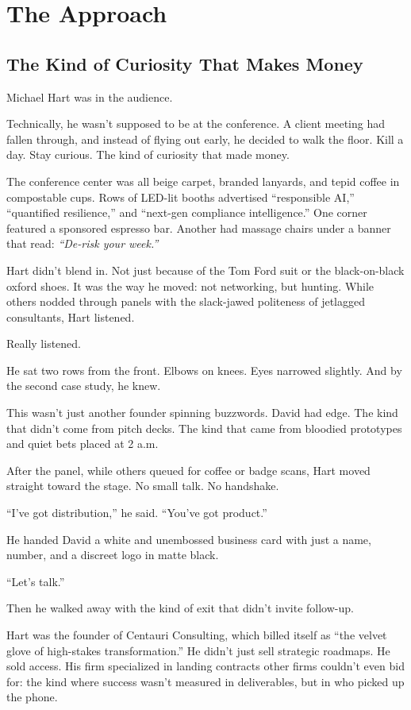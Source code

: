 
\section{The Approach}

\subsection{The Kind of Curiosity That Makes Money}

Michael Hart was in the audience.

Technically, he wasn’t supposed to be at the conference. A client meeting had fallen through, and instead 
of flying out early, he decided to walk the floor. Kill a day. Stay curious. The kind of curiosity 
that made money.

The conference center was all beige carpet, branded lanyards, and tepid coffee in compostable cups. Rows of 
LED-lit booths advertised ``responsible AI,'' ``quantified resilience,'' and ``next-gen compliance intelligence.''
One corner featured a sponsored espresso bar. Another had massage chairs under a banner that read: 
\textit{``De-risk your week.''}

Hart didn’t blend in. Not just because of the Tom Ford suit or the black-on-black oxford shoes. It was the 
way he moved: not networking, but hunting. While others nodded through panels with the slack-jawed politeness 
of jetlagged consultants, Hart listened.

Really listened.

He sat two rows from the front. Elbows on knees. Eyes narrowed slightly. And by the second case study, he knew.

This wasn’t just another founder spinning buzzwords. David had edge. The kind that didn’t come from pitch decks. 
The kind that came from bloodied prototypes and quiet bets placed at 2 a.m.

After the panel, while others queued for coffee or badge scans, Hart moved straight toward the stage. No small talk. 
No handshake.

``I’ve got distribution,'' he said. ``You’ve got product.''

He handed David a white and unembossed business card with just a name, number, and a discreet logo in matte black.

``Let’s talk.''

Then he walked away with the kind of exit that didn’t invite follow-up.

Hart was the founder of Centauri Consulting, which billed itself as ``the velvet glove of high-stakes transformation.''
He didn’t just sell strategic roadmaps. He sold access. His firm specialized in landing contracts other firms 
couldn’t even bid for: the kind where success wasn’t measured in deliverables, but in who picked up the phone.


